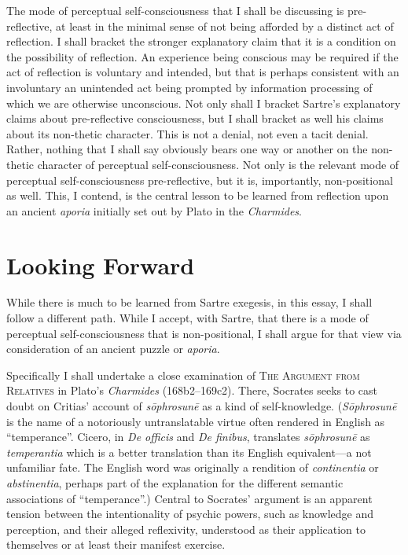 The mode of perceptual self-consciousness that I shall be discussing is pre-reflective, at least in the minimal sense of not being afforded by a distinct act of reflection. I shall bracket the stronger explanatory claim that it is a condition on the possibility of reflection. An experience being conscious may be required if the act of reflection is voluntary and intended, but that is perhaps consistent with an involuntary an unintended act being prompted by information processing of which we are otherwise unconscious. Not only shall I bracket Sartre's explanatory claims about pre-reflective consciousness, but I shall bracket as well his claims about its non-thetic character. This is not a denial, not even a tacit denial. Rather, nothing that I shall say obviously bears one way or another on the non-thetic character of perceptual self-consciousness. Not only is the relevant mode of perceptual self-consciousness pre-reflective, but it is, importantly, non-positional as well. This, I contend, is the central lesson to be learned from reflection upon an ancient \emph{aporia} initially set out by Plato in the \emph{Charmides}.


\section{Looking Forward} %

While there is much to be learned from Sartre exegesis, in this essay, I shall follow a different path. While I accept, with Sartre, that there is a mode of perceptual self-consciousness that is non-positional, I shall argue for that view via consideration of an ancient puzzle or \emph{aporia}.

Specifically I shall undertake a close examination of \textsc{The Argument from Relatives} in Plato's \emph{Charmides} (168b2–169c2). There, Socrates seeks to cast doubt on Critias' account of \emph{sōphrosunē} as a kind of self-knowledge. (\emph{Sōphrosunē} is the name of a notoriously untranslatable virtue often rendered in English as ``temperance''. Cicero, in \emph{De officis} and \emph{De finibus}, translates \emph{sōphrosunē} as \emph{temperantia} which is a better translation than its English equivalent—a not unfamiliar fate. The English word was originally a rendition of \emph{continentia} or \emph{abstinentia}, perhaps part of the explanation for the different semantic associations of ``temperance''.) Central to Socrates' argument is an apparent tension between the intentionality of psychic powers, such as knowledge and perception, and their alleged reflexivity, understood as their application to themselves or at least their manifest exercise.


